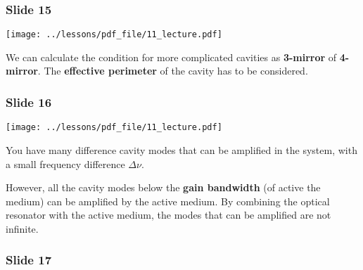 \documentclass[../main/main.tex]{subfiles}
\begin{document}
\subsubsection*{Slide 15}

\begin{minipage}[]{0.5\linewidth}
\centering
\texttt{[image: ../lessons/pdf\_file/11\_lecture.pdf]}
\end{minipage}
\hspace{0.3cm}\vspace{0.3cm}
\begin{minipage}[c]{0.47\linewidth}

We can calculate the condition for more complicated cavities as \textbf{3-mirror} of \textbf{4-mirror}. The \textbf{effective perimeter} of the cavity has to be considered.

\end{minipage}

\subsubsection*{Slide 16}

\begin{minipage}[]{0.5\linewidth}
\centering
\texttt{[image: ../lessons/pdf\_file/11\_lecture.pdf]}
\end{minipage}
\hspace{0.3cm}\vspace{0.3cm}
\begin{minipage}[c]{0.47\linewidth}

You have many difference cavity modes that can be amplified in the system, with a small frequency difference \( \Delta \nu  \).

However, all the cavity modes below the \textbf{gain bandwidth} (of active the medium) can be amplified by the active medium. By combining the optical resonator with the active medium, the modes that can be amplified are not infinite.

\end{minipage}

\subsubsection*{Slide 17}
\end{document}
